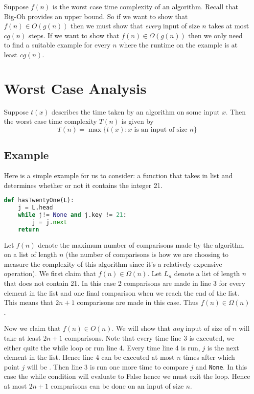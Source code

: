 Suppose $f(n)$ is the worst case time complexity of an algorithm. Recall that Big-Oh provides an upper bound. So if we want to show that $f(n) \in O(g(n))$ then we must show that \textit{every} input of size $n$ takes at most $cg(n)$ steps. If we want to show that $f(n) \in \Omega(g(n))$ then we only need to find a suitable example for every $n$ where the runtime on the example is at least $cg(n)$. 

\section{Worst Case Analysis}
Suppose $t(x)$ describes the time taken by an algorithm on some input $x$. Then the worst case time complexity $T(n)$ is given by
$$ T(n) = \max \{ t(x) : x \text{ is an input of size } n \} $$

\subsection{Example}
Here is a simple example for us to consider: a function that takes in list and determines whether or not it contains the integer 21.
\begin{lstlisting}[language=Python]
def hasTwentyOne(L):
    j = L.head
    while j!= None and j.key != 21:
        j = j.next
    return
\end{lstlisting}

Let $f(n)$ denote the maximum number of comparisons made by the algorithm on a list of length $n$ (the number of comparisons is how we are choosing to measure the complexity of this algorithm since it's a relatively expensive operation). We first claim that $f(n) \in \Omega(n)$. Let $L_n$ denote a list of length $n$ that does not contain 21. In this case 2 comparisons are made in line 3 for every element in the list and one final comparison when we reach the end of the list. This means that $2n + 1$ comparisons are made in this case. Thus $f(n) \in \Omega(n)$.

Now we claim that $f(n) \in O(n)$. We will show that \textit{any} input of size of $n$ will take at least $2n + 1$ comparisons. Note that every time line 3 is executed, we either quite the while loop or run line 4. Every time line 4 is run, $j$ is the next element in the list. Hence line 4 can be executed at most $n$ times after which point $j$ will be . Then line 3 is run one more time to compare $j$ and \texttt{None}. In this case the while condition will evaluate to False hence we must exit the loop. Hence at most $2n + 1$ comparisons can be done on an input of size $n$.

